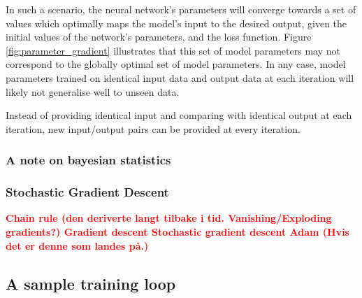 In such a scenario, the neural network's parameters will converge towards a set of values which optimally maps the model's input to the desired output,
given the initial values of the network's parameters, and the loss function. Figure \ref{fig:parameter_gradient} illustrates that this set of model parameters
may not correspond to the globally optimal set of model parameters. In any case, model parameters trained on identical input data and output data at each iteration
will likely not generalise well to unseen data.

Instead of providing identical input and comparing with identical output at each iteration, new input/output pairs can be provided at every iteration.


















\subsubsection{A note on bayesian statistics}



\subsubsection{Stochastic Gradient Descent}



















\textcolor{red}{\textbf{
    Chain rule (den deriverte langt tilbake i tid. Vanishing/Exploding gradients?)
    Gradient descent
    Stochastic gradient descent
    Adam (Hvis det er denne som landes på.)
}}







\subsection{A sample training loop}












